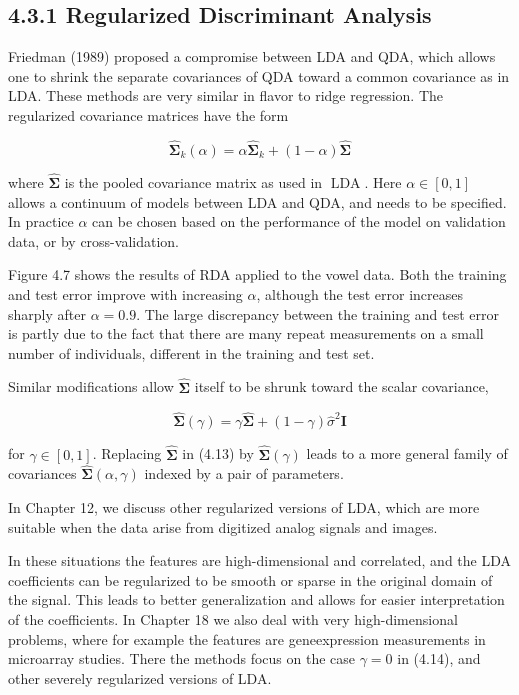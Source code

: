 \documentclass[10pt]{article}
\begin{document}
\subsection*{4.3.1 Regularized Discriminant Analysis}
Friedman (1989) proposed a compromise between LDA and QDA, which allows one to shrink the separate covariances of QDA toward a common covariance as in LDA. These methods are very similar in flavor to ridge regression. The regularized covariance matrices have the form


\begin{equation*}
\hat{\boldsymbol{\Sigma}}_{k}(\alpha)=\alpha \hat{\boldsymbol{\Sigma}}_{k}+(1-\alpha) \hat{\boldsymbol{\Sigma}} \tag{4.13}
\end{equation*}


where $\hat{\boldsymbol{\Sigma}}$ is the pooled covariance matrix as used in $\operatorname{LDA}$. Here $\alpha \in[0,1]$ allows a continuum of models between LDA and QDA, and needs to be specified. In practice $\alpha$ can be chosen based on the performance of the model on validation data, or by cross-validation.

Figure 4.7 shows the results of RDA applied to the vowel data. Both the training and test error improve with increasing $\alpha$, although the test error increases sharply after $\alpha=0.9$. The large discrepancy between the training and test error is partly due to the fact that there are many repeat measurements on a small number of individuals, different in the training and test set.

Similar modifications allow $\hat{\boldsymbol{\Sigma}}$ itself to be shrunk toward the scalar covariance,


\begin{equation*}
\hat{\boldsymbol{\Sigma}}(\gamma)=\gamma \hat{\boldsymbol{\Sigma}}+(1-\gamma) \hat{\sigma}^{2} \mathbf{I} \tag{4.14}
\end{equation*}


for $\gamma \in[0,1]$. Replacing $\hat{\boldsymbol{\Sigma}}$ in (4.13) by $\hat{\boldsymbol{\Sigma}}(\gamma)$ leads to a more general family of covariances $\hat{\boldsymbol{\Sigma}}(\alpha, \gamma)$ indexed by a pair of parameters.

In Chapter 12, we discuss other regularized versions of LDA, which are more suitable when the data arise from digitized analog signals and images.

In these situations the features are high-dimensional and correlated, and the LDA coefficients can be regularized to be smooth or sparse in the original domain of the signal. This leads to better generalization and allows for easier interpretation of the coefficients. In Chapter 18 we also deal with very high-dimensional problems, where for example the features are geneexpression measurements in microarray studies. There the methods focus on the case $\gamma=0$ in (4.14), and other severely regularized versions of LDA.
\end{document}
